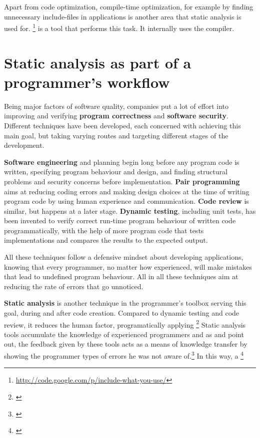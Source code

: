 Apart from code optimization, compile-time optimization, for example by finding unnecessary include-files in  applications is another area that static analysis is used for. \footnote{\url{http://code.google.com/p/include-what-you-use/}} is a tool that performs this task. It internally uses the  compiler.

\section{Static analysis as part of a programmer's workflow}

Being major factors of software quality, companies put a lot of effort into improving and verifying \textbf{program correctness} and \textbf{software security}. Different techniques have been developed, each concerned with achieving this main goal, but taking varying routes and targeting different stages of the development.

\textbf{Software engineering} and planning begin long before any program code is written, specifying program behaviour and design, and finding structural problems and security concerns before implementation. \textbf{Pair programming} aims at reducing coding errors and making design choices at the time of writing program code by using human experience and communication. \textbf{Code review} is similar, but happens at a later stage. \textbf{Dynamic testing}, including unit tests, has been invented to verify correct run-time program behaviour of written code programmatically, with the help of more program code that tests implementations and compares the results to the expected output.

All these techniques follow a defensive mindset about developing applications, knowing that every programmer, no matter how experienced, will make mistakes that lead to undefined program behaviour. All in all these techniques aim at reducing the rate of errors that go unnoticed.

\textbf{Static analysis} is another technique in the programmer's toolbox serving this goal, during and after code creation. Compared to dynamic testing and code review, it reduces the human factor, programatically applying \footnote{\citep[22]{SecureProgramming}} Static analysis tools accumulate the knowledge of experienced programmers and as  and  point out, the feedback given by these tools acts as a means of knowledge transfer by showing the programmer types of errors he was not aware of.\footnote{\citep[22]{SecureProgramming}} In this way, a \footnote{\citep[13]{SecureProgramming}}

